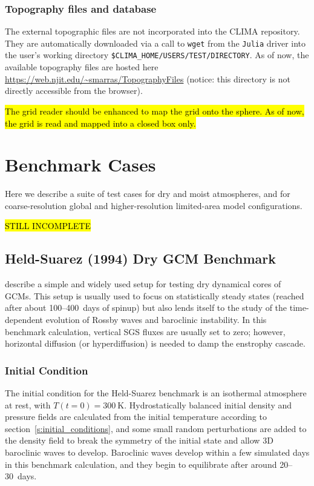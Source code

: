 \documentclass{report}
\begin{document}
\subsection{Topography files and database}
The external topographic files are not incorporated into the CLIMA repository. 
They are automatically downloaded via a call to {\tt wget} from the {\tt Julia} driver into the user's working directory {\tt \$CLIMA\_HOME/USERS/TEST/DIRECTORY}. As of now, the available topography files are hosted here \url{https://web.njit.edu/~smarras/TopographyFiles} (notice: this directory is not directly accessible from the browser).

\hl{The grid reader should be enhanced to map the grid onto the sphere. As of now, the grid is read and mapped into a closed box only.}

\chapter{Benchmark Cases}

Here we describe a suite of test cases for dry and moist atmospheres, and for coarse-resolution global and higher-resolution limited-area model configurations. 

\hl{STILL INCOMPLETE}

\section{Held-Suarez (1994) Dry GCM Benchmark}

\citet{Held94} describe a simple and widely used setup for testing dry dynamical cores of GCMs. This setup is usually used to focus on statistically steady states (reached after about 100--400~days of spinup) but also lends itself to the study of the time-dependent evolution of Rossby waves and baroclinic instability. In this benchmark calculation, vertical SGS fluxes are usually set to zero; however, horizontal diffusion (or hyperdiffusion) is needed to damp the enstrophy cascade. 

\subsection{Initial Condition}

The initial condition for the Held-Suarez benchmark is an isothermal atmosphere at rest, with $T(t=0) = 300~\mathrm{K}$. Hydrostatically balanced initial density and pressure fields are calculated from the initial temperature according to section~\ref{s:initial_conditions}, and some small random perturbations are added to the density field to break the symmetry of the initial state and allow 3D baroclinic waves to develop. Baroclinic waves develop within a few simulated days in this benchmark calculation, and they begin to equilibrate after around 20--30~days. 
\end{document}

